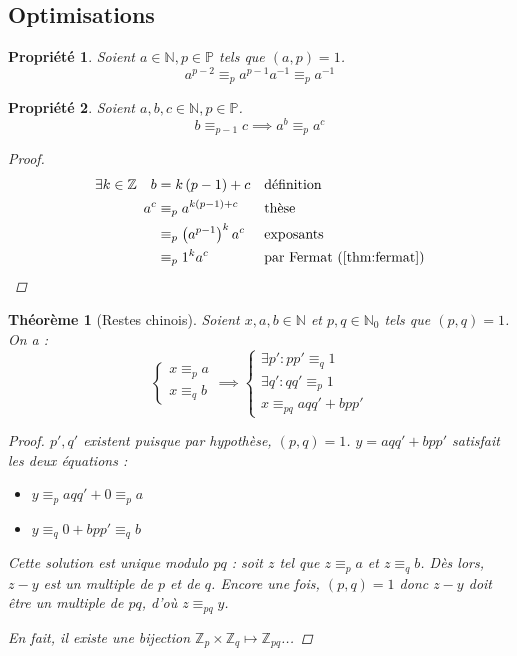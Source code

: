 \documentclass[11pt,twocolumn]{article}
\theoremstyle{plain}
\newtheorem{pr}{Propriété}
\newtheorem{thm}{Théorème}
\newcommand{\esP}{\mathbb{P}} %
\newcommand{\esN}{\mathbb{N}} %
\newcommand{\esZ}{\mathbb{Z}} %
\begin{document}
\subsection{Optimisations}
\begin{pr}
	Soient $a \in \esN, p \in \esP$ tels que $(a,p)=1$. \[
		a^{p-2} \equiv_p a^{p-1}a^{-1} \equiv_p a^{-1}
	\]
\end{pr}
\begin{pr}
	Soient $a,b,c \in \esN, p \in \esP$. \[
		b \equiv_{p-1} c
		\implies
		a^b \equiv_p a^c
	\]
	\begin{proof}
		\begin{align*}
			\exists k \in \esZ \quad b
			&= k\left(p-1\right)+c && \text{définition} \\
			a^c
			&\equiv_p a^{k\left(p-1\right)+c} && \text{thèse} \\
			&\equiv_p \left(a^{p-1}\right)^ka^c && \text{exposants} \\
			&\equiv_p 1^ka^c && \text{par Fermat (\ref{thm:fermat})}
		\end{align*}
	\end{proof}
\end{pr}
\begin{thm}[Restes chinois]\label{thm:chrem}
	Soient $x,a,b \in \esN$ et $p,q \in \esN_0$ tels que $(p,q)=1$. On a : \[
		\left\{\begin{array}{ll}
			x \equiv_p a \\
			x \equiv_q b
		\end{array}\right.
		\implies
		\left\{\begin{array}{l}
			\exists p' : pp'\equiv_q1 \\
			\exists q' : qq'\equiv_p1 \\
			x \equiv_{pq} aqq'+bpp'
		\end{array}\right.
	\]
	\begin{proof}
		$p', q'$ existent puisque par hypothèse, $(p,q)=1$.
		$y=aqq'+bpp'$ satisfait les deux équations :
		\begin{itemize}
			\item $y \equiv_p aqq' + 0 \equiv_p a$
			\item $y \equiv_q 0 + bpp' \equiv_q b$
		\end{itemize}

		Cette solution est unique modulo $pq$ : soit $z$ tel que
		$z \equiv_p a$ et $z \equiv_q b$. Dès lors, $z-y$ est un multiple de $p$
		et de $q$. Encore une fois, $(p,q)=1$ donc $z-y$ doit être un multiple
		de $pq$, d'où $z \equiv_{pq} y$.

		En fait, il existe une bijection
		$\esZ_p \times \esZ_q \mapsto \esZ_{pq}$...
	\end{proof}
\end{thm}
\end{document}
